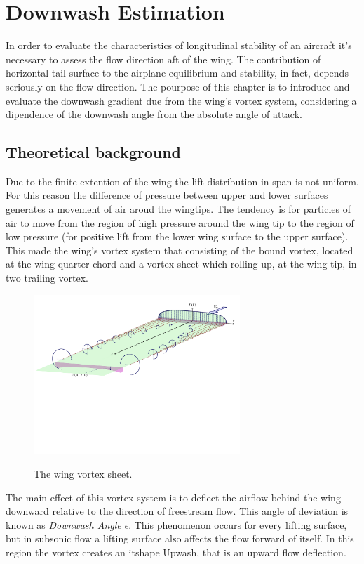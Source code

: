 \chapter{Downwash Estimation}

In order to evaluate the characteristics of longitudinal stability of an aircraft it's necessary to assess the flow direction aft of the wing. The contribution of horizontal tail surface to the airplane equilibrium and stability, in fact, depends seriously on the flow direction. The pourpose of this chapter is to introduce and evaluate the downwash gradient due from the wing's vortex system, considering a dipendence of the downwash angle from the absolute angle of attack. 

\section{Theoretical background}

Due to the finite extention of the wing the lift distribution in span is not uniform. For this reason the difference of pressure between upper and lower surfaces generates a movement of air aroud the wingtips. The tendency is for particles of air to move from the region of high pressure around the wing tip to the region of low pressure (for positive lift from the lower wing surface to the upper surface). This made the wing's vortex system that consisting of the bound vortex, located at the wing quarter chord and a vortex sheet which rolling up, at the wing tip, in two trailing vortex.\cite{PerkinsHage} \cite{Jacobs:NACA:Rep:648} \\ 

\begin{figure}[H]
\centering
{\includegraphics[height=6cm]{Immagini/wing_vortex_sheet3.pdf}} 
\caption{The wing vortex sheet.}
\end{figure}

The main effect of this vortex system is to deflect the airflow behind the wing downward relative to the direction of freestream flow. This angle of deviation is known as {\itshape Downwash Angle} $\epsilon$. This phenomenon occurs for every lifting surface, but in subsonic flow a lifting surface also affects the flow forward of itself. In this region the vortex creates an {itshape Upwash}, that is an upward flow deflection.\\


